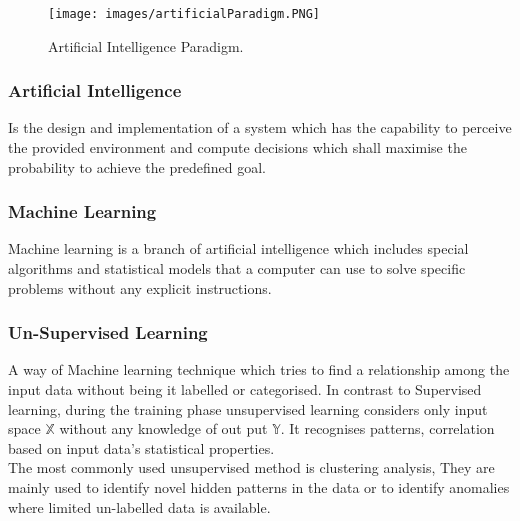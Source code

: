 \documentclass{article}
\begin{document}
\begin{figure}[htp]
    \centering
    \texttt{[image: images/artificialParadigm.PNG]}
    \caption{Artificial Intelligence Paradigm.}
    \label{fig: Artifical Paradigm}
\end{figure}



\subsubsection{Artificial Intelligence}Is the design and implementation of a system which has the capability to perceive the provided environment and compute decisions which shall maximise the probability to achieve the predefined goal.
\\

\subsubsection{Machine Learning}Machine learning is a branch of artificial intelligence which includes special algorithms and statistical models that a computer can use to solve specific problems without any explicit instructions.
\\

\subsubsection{Un-Supervised Learning}A way of Machine learning technique which tries to find a relationship among the input data without being it labelled or categorised. In contrast to Supervised learning, during the training phase unsupervised learning considers only input space \(\mathbb{X}\) without any knowledge of out put \(\mathbb{Y}\). It recognises patterns, correlation based on input data's statistical properties. \\
The most commonly used unsupervised method is clustering analysis, They are mainly used to identify novel hidden patterns in the data or to identify anomalies where limited un-labelled data is available.
\end{document}
